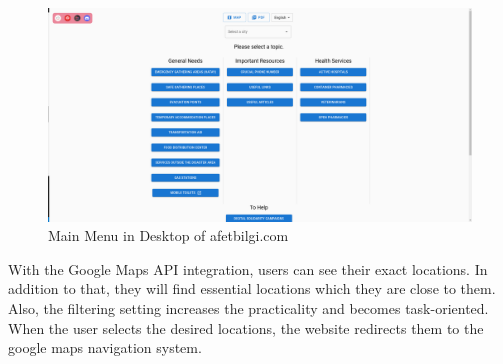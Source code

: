 \begin{figure}[H]
    \begin{center}
        \includegraphics[scale = 0.18]{assets/desktopInterface.png}
        \caption[Main Menu in Desktop]{Main Menu in Desktop of afetbilgi.com}
    \end{center}
\end{figure}

With the Google Maps API integration, users can see their exact locations. In addition to that, they will find essential locations which they are close to them. Also, the filtering setting increases the practicality and becomes task-oriented. When the user selects the desired locations, the website redirects them to the google maps navigation system. 

